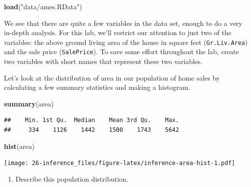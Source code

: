 \documentclass[]{book}
\newenvironment{Shaded}{\begin{snugshade}}{\end{snugshade}}
\newcommand{\KeywordTok}[1]{\textcolor[rgb]{0.13,0.29,0.53}{\textbf{{#1}}}}
\newcommand{\StringTok}[1]{\textcolor[rgb]{0.31,0.60,0.02}{{#1}}}
\newcommand{\NormalTok}[1]{{#1}}
\providecommand{\tightlist}{%
  \setlength{\itemsep}{0pt}\setlength{\parskip}{0pt}}
\theoremstyle{definition}
\theoremstyle{definition}
\theoremstyle{remark}
\begin{document}
\begin{Shaded}
\begin{Highlighting}[]
\KeywordTok{load}\NormalTok{(}\StringTok{"data/ames.RData"}\NormalTok{)}
\end{Highlighting}
\end{Shaded}

We see that there are quite a few variables in the data set, enough to
do a very in-depth analysis. For this lab, we'll restrict our attention
to just two of the variables: the above ground living area of the house
in square feet (\texttt{Gr.Liv.Area}) and the sale price
(\texttt{SalePrice}). To save some effort throughout the lab, create two
variables with short names that represent these two variables.

\begin{Shaded}
\end{Shaded}

Let's look at the distribution of area in our population of home sales
by calculating a few summary statistics and making a histogram.

\begin{Shaded}
\begin{Highlighting}[]
\KeywordTok{summary}\NormalTok{(area)}
\end{Highlighting}
\end{Shaded}

\begin{verbatim}
##    Min. 1st Qu.  Median    Mean 3rd Qu.    Max. 
##     334    1126    1442    1500    1743    5642
\end{verbatim}

\begin{Shaded}
\begin{Highlighting}[]
\KeywordTok{hist}\NormalTok{(area)}
\end{Highlighting}
\end{Shaded}

\texttt{[image: 26-inference\_files/figure-latex/inference-area-hist-1.pdf]}

\begin{enumerate}
\def\labelenumi{\arabic{enumi}.}
\tightlist
\item
  Describe this population distribution.
\end{enumerate}
\end{document}
